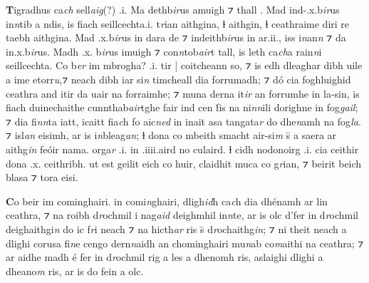 \documentclass[11pt]{article}
\begin{document}
\begin{pages}
  \begin{Leftside}
    \beginnumbering
    \pstart
    \textbf{T}igradhus ca\emph{ch} sell\emph{aig}(?) .i. Ma dethb\emph{ir}us amuigh ⁊ thall . Mad ind-.x.b\emph{ir}us in\emph{n}tib a ndis, is fiach seillcechta.i. t\emph{r}ian aithgina, ɫ aithgin, ɫ ceathraime diri re taebh aithgina.  Mad .x.b\emph{ir}us in dara de ⁊ indeithb\emph{ir}us in ar.ii., iss i\emph{n}an\emph{n} ⁊ da in.x.b\emph{ir}us. Madh .x. b\emph{ir}us imuigh  ⁊ con\emph{n}tob\emph{air}t tall, is leth ca\emph{ch}a rain\emph{n}i seillcechta. Co b\emph{er}  im  mbrogha? .i. tir  | coitcheann so, ⁊ is edh dleaghar dibh uile a ime etorr\emph{u},⁊ neach dibh iar si\emph{n} timcheall dia forrumadh; ⁊  d\'{o} cia foghluighid ceathra and itir da uair na forraimhe; ⁊ muna derna it\emph{ir} an forrumhe in la-sin, is fiach duinechaithe cunnthab\emph{air}tghe fair ind cen \.{f}is na ni\emph{nn}ili dorighne in fog\emph{gail}; ⁊ dia fi\emph{nn}ta iatt, icaitt fia\emph{c}h fo aic\emph{ned} in inait asa tangata\emph{r} do dhe\emph{n}amh na fog\emph{la}. ⁊ isl\emph{an} eisimh, ar is i\emph{n}bleag\emph{an}; ɫ dona co mbeith smacht air-si\emph{m} \={s} a saera ar aithg\emph{in} fe\'{o}ir nama.  orga\emph{r} .i. in .iiii.aird no culaird. ɫ cidh nodonoirg .i. cia ceithir dona .x. ceithribh. ut est geilit eich co huir, claidhit muca co g\emph{r}ian, ⁊ beirit beich blasa ⁊ tora eisi. 
    \pend

    \pstart
    \textbf{C}o beir  im  cominghairi.  in comi\emph{n}ghairi, dligh\emph{id}h ca\emph{c}h dia dh\'{e}namh ar lin ceathra, ⁊ na roibh d\emph{r}ochmil i nag\emph{aid} deighmhil in\emph{n}te, ar is olc d'fer in d\emph{r}ochmil deighaithgi\emph{n} do ic f\emph{r}i neach ⁊ na hicth\emph{ar} ris \={s} d\emph{r}ochaithg\emph{in}; ⁊ ni theit neach a dlighi corusa fi\emph{n}e cengo dern\emph{n}aidh an chominghairi mu\emph{n}ab co\emph{m}aithi na ceathra; ⁊ ar aidhe madh \'{e} fer in d\emph{r}ochmil rig a les a dhenomh ris, aslaighi dlighi a dheano\emph{m} ris, ar is do fein a olc.
    \pend
    \endnumbering
  \end{Leftside}


\end{pages}
\end{document}
